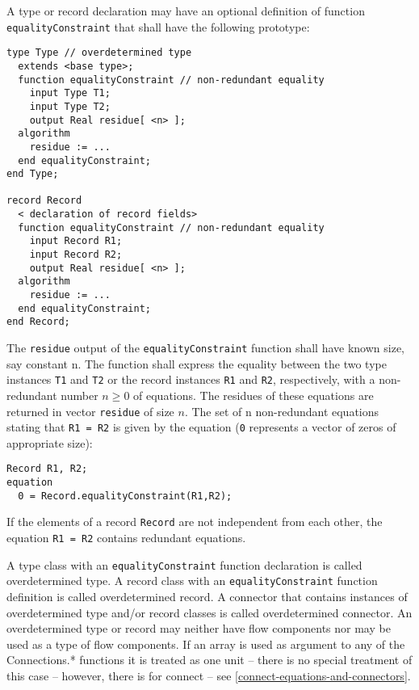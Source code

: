 A type or record declaration may have an optional definition of function
\lstinline!equalityConstraint! that shall have the following prototype:
\begin{lstlisting}[language=modelica]
type Type // overdetermined type
  extends <base type>;
  function equalityConstraint // non-redundant equality
    input Type T1;
    input Type T2;
    output Real residue[ <n> ];
  algorithm
    residue := ...
  end equalityConstraint;
end Type;

record Record
  < declaration of record fields>
  function equalityConstraint // non-redundant equality
    input Record R1;
    input Record R2;
    output Real residue[ <n> ];
  algorithm
    residue := ...
  end equalityConstraint;
end Record;
\end{lstlisting}
The \lstinline!residue! output of the \lstinline!equalityConstraint! function shall have
known size, say constant n. The function shall express the equality
between the two type instances \lstinline!T1! and \lstinline!T2! or the record instances
\lstinline!R1! and
\lstinline!R2!, respectively, with a non-redundant number $n \ge 0$ of equations. The
residues of these equations are returned in vector \lstinline!residue! of size
$n$. The set of n non-redundant equations stating that \lstinline!R1 = R2! is given by
the equation (\lstinline!0! represents a vector of zeros of appropriate size):
\begin{lstlisting}[language=modelica]
  Record R1, R2;
equation
  0 = Record.equalityConstraint(R1,R2);
\end{lstlisting}
\begin{nonnormative}
If the elements of a record \lstinline!Record! are not independent from each other, the equation \lstinline!R1 = R2! contains redundant equations.
\end{nonnormative}

A type class with an \lstinline!equalityConstraint! function declaration is called
overdetermined type. A record class with an \lstinline!equalityConstraint! function
definition is called overdetermined record. A connector that contains
instances of overdetermined type and/or record classes is called
overdetermined connector. An overdetermined type or record may neither
have flow components nor may be used as a type of flow components. If an
array is used as argument to any of the Connections.* functions it is
treated as one unit -- there is no special treatment of this case --
however, there is for connect -- see \autoref{connect-equations-and-connectors}.

